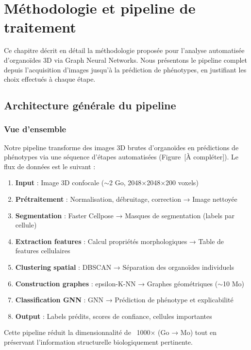 
\chapter{Méthodologie et pipeline de traitement}

Ce chapitre décrit en détail la méthodologie proposée pour l'analyse automatisée d'organoïdes 3D via Graph Neural Networks. Nous présentons le pipeline complet depuis l'acquisition d'images jusqu'à la prédiction de phénotypes, en justifiant les choix effectués à chaque étape.

\section{Architecture générale du pipeline}

\subsection{Vue d'ensemble}

Notre pipeline transforme des images 3D brutes d'organoïdes en prédictions de phénotypes via une séquence d'étapes automatisées (Figure~[À compléter]). Le flux de données est le suivant :

\begin{enumerate}
    \item \textbf{Input} : Image 3D confocale ($\sim$2 Go, 2048×2048×200 voxels)
    \item \textbf{Prétraitement} : Normalisation, débruitage, correction → Image nettoyée
    \item \textbf{Segmentation} : Faster Cellpose → Masques de segmentation (labels par cellule)
    \item \textbf{Extraction features} : Calcul propriétés morphologiques → Table de features cellulaires
    \item \textbf{Clustering spatial} : DBSCAN → Séparation des organoïdes individuels
    \item \textbf{Construction graphes} : epsilon-K-NN → Graphes géométriques ($\sim$10 Mo)
    \item \textbf{Classification GNN} : GNN → Prédiction de phénotype et explicabilité
    \item \textbf{Output} : Labels prédits, scores de confiance, cellules importantes
\end{enumerate}

Cette pipeline réduit la dimensionnalité de ~1000× (Go → Mo) tout en préservant l'information structurelle biologiquement pertinente.


